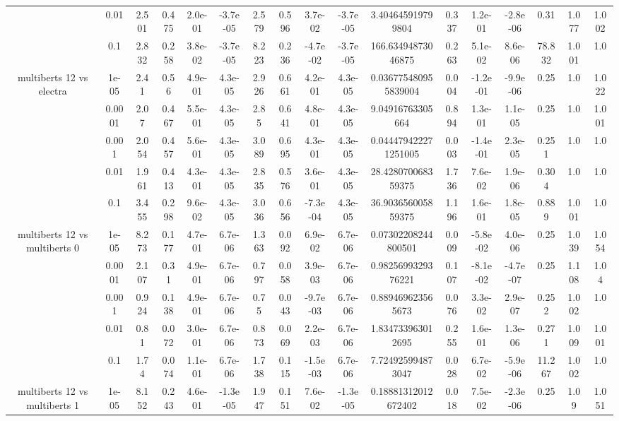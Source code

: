 \begin{tabular}{|c|c|c|c|c|c|c|c|c|c|c|c|c|c|c|c|c|}
 & 0.01 & 2.501 & 0.475 & 2.0e-01 & -3.7e-05 & 2.579 & 0.596 & 3.7e-02 & -3.7e-05 & 3.404645919799804 & 0.337 & 1.2e-01 & -2.8e-06 & 0.31 & 1.077 & 1.002 \\
 & 0.1 & 2.832 & 0.258 & 3.8e-02 & -3.7e-05 & 8.223 & 0.236 & -4.7e-02 & -3.7e-05 & 166.63494873046875 & 0.263 & 5.1e-02 & 8.6e-06 & 78.832 & 1.001 & 1.0 \\
\hline
\multirow{5}{*}{multiberts 12 vs electra } & 1e-05 & 2.41 & 0.56 & 4.9e-01 & 4.3e-05 & 2.926 & 0.661 & 4.2e-01 & 4.3e-05 & 0.036775480955839004 & 0.004 & -1.2e-01 & -9.9e-06 & 0.25 & 1.0 & 1.022 \\
 & 0.0001 & 2.07 & 0.467 & 5.5e-01 & 4.3e-05 & 2.85 & 0.641 & 4.8e-01 & 4.3e-05 & 9.04916763305664 & 0.894 & 1.3e-01 & 1.1e-05 & 0.25 & 1.0 & 1.001 \\
 & 0.001 & 2.054 & 0.457 & 5.6e-01 & 4.3e-05 & 3.089 & 0.695 & 4.3e-01 & 4.3e-05 & 0.044479422271251005 & 0.003 & -1.4e-01 & 2.3e-05 & 0.251 & 1.0 & 1.0 \\
 & 0.01 & 1.961 & 0.413 & 4.3e-01 & 4.3e-05 & 2.835 & 0.576 & 3.6e-01 & 4.3e-05 & 28.428070068359375 & 1.736 & 7.6e-02 & 1.9e-06 & 0.304 & 1.0 & 1.0 \\
 & 0.1 & 3.455 & 0.298 & 9.6e-02 & 4.3e-05 & 3.036 & 0.656 & -7.3e-04 & 4.3e-05 & 36.903656005859375 & 1.196 & 1.6e-01 & 1.8e-05 & 0.889 & 1.001 & 1.0 \\
\hline
\multirow{5}{*}{multiberts 12 vs multiberts 0} & 1e-05 & 8.273 & 0.177 & 4.7e-01 & 6.7e-06 & 1.363 & 0.092 & 6.9e-02 & 6.7e-06 & 0.07302208244800501 & 0.009 & -5.8e-02 & 4.0e-06 & 0.25 & 1.039 & 1.054 \\
 & 0.0001 & 2.107 & 0.31 & 4.9e-01 & 6.7e-06 & 0.797 & 0.058 & 3.9e-03 & 6.7e-06 & 0.9825699329376221 & 0.107 & -8.1e-02 & -4.7e-07 & 0.25 & 1.108 & 1.04 \\
 & 0.001 & 0.924 & 0.138 & 4.9e-01 & 6.7e-06 & 0.75 & 0.043 & -9.7e-03 & 6.7e-06 & 0.889469623565673 & 0.076 & 3.3e-02 & 2.9e-07 & 0.252 & 1.002 & 1.0 \\
 & 0.01 & 0.81 & 0.072 & 3.0e-01 & 6.7e-06 & 0.873 & 0.069 & 2.2e-03 & 6.7e-06 & 1.834733963012695 & 0.255 & 1.6e-01 & 1.3e-06 & 0.271 & 1.009 & 1.001 \\
 & 0.1 & 1.74 & 0.074 & 1.1e-01 & 6.7e-06 & 1.738 & 0.115 & -1.5e-03 & 6.7e-06 & 7.724925994873047 & 0.028 & 6.7e-02 & -5.9e-06 & 11.267 & 1.002 & 1.0 \\
\hline
\multirow{5}{*}{multiberts 12 vs multiberts 1} & 1e-05 & 8.152 & 0.243 & 4.6e-01 & -1.3e-05 & 1.947 & 0.151 & 7.6e-02 & -1.3e-05 & 0.18881312012672402 & 0.018 & 7.5e-02 & -2.3e-06 & 0.25 & 1.09 & 1.051 \\

\end{tabular}
